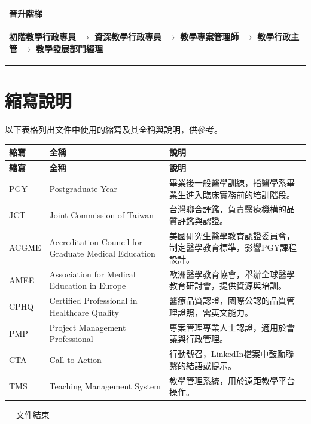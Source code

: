 \documentclass[12pt,a4paper]{article}
\begin{document}
\begin{longtable}{P{16cm}}
\toprule
\textbf{晉升階梯} \\
\midrule
\endhead

\begin{center}
\textbf{初階教學行政專員} $\rightarrow$ \textbf{資深教學行政專員} $\rightarrow$ \textbf{教學專案管理師} $\rightarrow$ \textbf{教學行政主管} $\rightarrow$ \textbf{教學發展部門經理}
\end{center} \\
\bottomrule

\end{longtable}


\newpage
\section{縮寫說明}
以下表格列出文件中使用的縮寫及其全稱與說明，供參考。

\begin{longtable}{C{3cm}L{6cm}L{6cm}}
    \hline
    \textbf{縮寫} & \textbf{全稱} & \textbf{說明} \\
    \hline
    \endfirsthead
    \hline
    \textbf{縮寫} & \textbf{全稱} & \textbf{說明} \\
    \hline
    \endhead
    \hline
    \endfoot
    \hline
    \endlastfoot
    
    PGY & Postgraduate Year & 畢業後一般醫學訓練，指醫學系畢業生進入臨床實務前的培訓階段。 \\
    \hline
    JCT & Joint Commission of Taiwan & 台灣聯合評鑑，負責醫療機構的品質評鑑與認證。 \\
    \hline
    ACGME & Accreditation Council for Graduate Medical Education & 美國研究生醫學教育認證委員會，制定醫學教育標準，影響PGY課程設計。 \\
    \hline
    AMEE & Association for Medical Education in Europe & 歐洲醫學教育協會，舉辦全球醫學教育研討會，提供資源與培訓。 \\
    \hline
    CPHQ & Certified Professional in Healthcare Quality & 醫療品質認證，國際公認的品質管理證照，需英文能力。 \\
    \hline
    PMP & Project Management Professional & 專案管理專業人士認證，適用於會議與行政管理。 \\
    \hline
    CTA & Call to Action & 行動號召，LinkedIn檔案中鼓勵聯繫的結語或提示。 \\
    \hline
    TMS & Teaching Management System & 教學管理系統，用於遠距教學平台操作。 \\
    
\end{longtable}


\vspace{1cm}
\begin{center}
    --- 文件結束 ---
\end{center}
\end{document}
